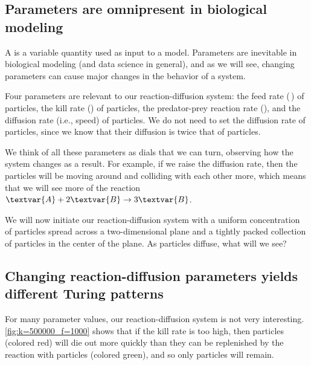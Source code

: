 \FloatBarrier
{}
\subsection{Parameters are omnipresent in biological modeling}

A  is a variable quantity used as input to a model. Parameters are inevitable in biological modeling (and data science in general), and as we will see, changing parameters can cause major changes in the behavior of a system.

Four parameters are relevant to our reaction-diffusion system: the feed rate (\,) of  particles, the kill rate () of  particles, the predator-prey reaction rate (), and the diffusion rate (i.e., speed) of  particles. We do not need to set the diffusion rate of  particles, since we know that their diffusion is twice that of  particles.

\begin{qbox}\end{qbox}

We think of all these parameters as dials that we can turn, observing how the system changes as a result. For example, if we raise the diffusion rate, then the particles will be moving around and colliding with each other more, which means that we will see more of the reaction $\textvar{A} + 2\textvar{B} \rightarrow 3\textvar{B}$.

We will now initiate our reaction-diffusion system with a uniform concentration of  particles spread across a two-dimensional plane and a tightly packed collection of  particles in the center of the plane. As  particles diffuse, what will we see?\\

\FloatBarrier
{}
\subsection{Changing reaction-diffusion parameters yields different Turing patterns}

For many parameter values, our reaction-diffusion system is not very interesting. \autoref{fig:k=500000_f=1000} shows that if the kill rate is too high, then  particles (colored red) will die out more quickly than they can be replenished by the reaction with  particles (colored green), and so only  particles will remain.


